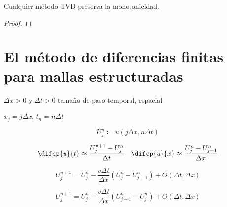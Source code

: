 \begin{theorem}
    Cualquier método TVD preserva la monotonicidad.
\end{theorem}

\begin{proof}

\end{proof}

\section*{El método de diferencias finitas para mallas estructuradas}

$\Delta x>0$ y $\Delta t>0$ tamaño de paso temporal, espacial

$x_{j}=j\Delta x$, $t_{n}=n\Delta t$

\begin{equation*}
    U^{n}_{j}\coloneqq
    u\left(j\Delta x, n\Delta t\right)
\end{equation*}

\begin{equation*}
    \difcp{u}{t}\approx
    \dfrac{U^{n+1}_{j}-U^{n}_{j}}{\Delta t}\quad
    \difcp{u}{x}\approx
    \dfrac{U^{n}_{j}-U^{n}_{j-1}}{\Delta x}
\end{equation*}

\begin{example}
    \begin{equation*}
        U^{n+1}_{j}=
        U^{n}_{j}-
        \dfrac{v\Delta t}{\Delta x}
        \left(U^{n}_{j}-U^{n}_{j-1}\right)+
        O\left(\Delta t,\Delta x\right)
    \end{equation*}
\end{example}

\begin{example}
    \begin{equation*}
        U^{n+1}_{j}=
        U^{n}_{j}-
        \dfrac{v\Delta t}{\Delta x}
        \left(U^{n}_{j+1}-U^{n}_{j}\right)+
        O\left(\Delta t,\Delta x\right)
    \end{equation*}
\end{example}


